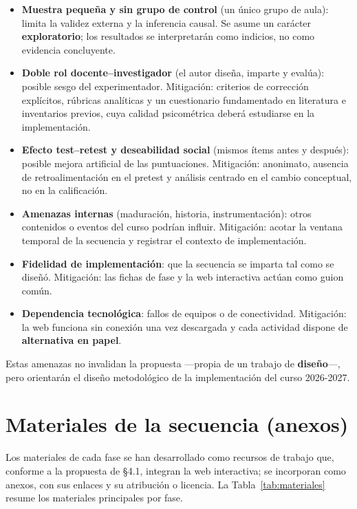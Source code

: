 \begin{itemize}
\item \textbf{Muestra pequeña y sin grupo de control} (un único grupo de aula): limita la validez externa y la inferencia causal. Se asume un carácter \textbf{exploratorio}; los resultados se interpretarán como indicios, no como evidencia concluyente.
\item \textbf{Doble rol docente--investigador} (el autor diseña, imparte y evalúa): posible sesgo del experimentador. Mitigación: criterios de corrección explícitos, rúbricas analíticas y un cuestionario fundamentado en literatura e inventarios previos, cuya calidad psicométrica deberá estudiarse en la implementación.
\item \textbf{Efecto test--retest y deseabilidad social} (mismos ítems antes y después): posible mejora artificial de las puntuaciones. Mitigación: anonimato, ausencia de retroalimentación en el pretest y análisis centrado en el cambio conceptual, no en la calificación.
\item \textbf{Amenazas internas} (maduración, historia, instrumentación): otros contenidos o eventos del curso podrían influir. Mitigación: acotar la ventana temporal de la secuencia y registrar el contexto de implementación.
\item \textbf{Fidelidad de implementación}: que la secuencia se imparta tal como se diseñó. Mitigación: las fichas de fase y la web interactiva actúan como guion común.
\item \textbf{Dependencia tecnológica}: fallos de equipos o de conectividad. Mitigación: la web funciona sin conexión una vez descargada y cada actividad dispone de \textbf{alternativa en papel}.
\end{itemize}

Estas amenazas no invalidan la propuesta ---propia de un trabajo de \textbf{diseño}---, pero orientarán el diseño metodológico de la implementación del curso 2026-2027.

\section{Materiales de la secuencia (anexos)}\label{sec:materiales}

Los materiales de cada fase se han desarrollado como recursos de trabajo que, conforme a la propuesta de §4.1, integran la web interactiva; se incorporan como anexos, con sus enlaces y su atribución o licencia. La Tabla~\ref{tab:materiales} resume los materiales principales por fase.


